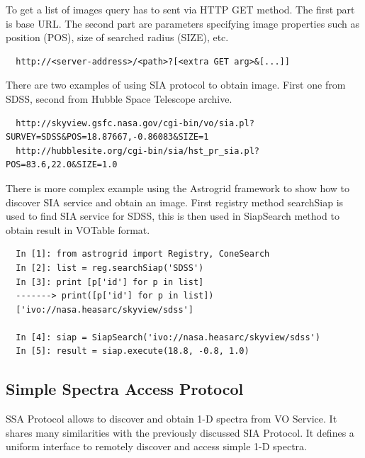 To get a list of images query has to sent via HTTP GET method. The
first part is base URL. The second part are parameters specifying
image properties such as position (POS), size of searched radius
(SIZE), etc.

\begin{lstlisting}
  http://<server-address>/<path>?[<extra GET arg>&[...]]
\end{lstlisting}

There are two examples of using SIA protocol to obtain image. First
one from SDSS, second from Hubble Space Telescope archive. 

\begin{lstlisting}
  http://skyview.gsfc.nasa.gov/cgi-bin/vo/sia.pl?SURVEY=SDSS&POS=18.87667,-0.86083&SIZE=1
  http://hubblesite.org/cgi-bin/sia/hst_pr_sia.pl?POS=83.6,22.0&SIZE=1.0
\end{lstlisting}

There is more complex example using the Astrogrid framework to show
how to discover SIA service and obtain an image. First registry method
searchSiap is used to find SIA service for SDSS, this is then used in
SiapSearch method to obtain result in VOTable format.

\begin{lstlisting}
  In [1]: from astrogrid import Registry, ConeSearch
  In [2]: list = reg.searchSiap('SDSS')
  In [3]: print [p['id'] for p in list]
  -------> print([p['id'] for p in list])
  ['ivo://nasa.heasarc/skyview/sdss']
  
  In [4]: siap = SiapSearch('ivo://nasa.heasarc/skyview/sdss')
  In [5]: result = siap.execute(18.8, -0.8, 1.0)
\end{lstlisting}



 

\subsection{Simple Spectra Access Protocol}

SSA Protocol allows to discover and obtain 1-D spectra from VO
Service. It shares many similarities with the previously discussed SIA
Protocol. It defines a uniform interface to remotely discover and
access simple 1-D spectra.

